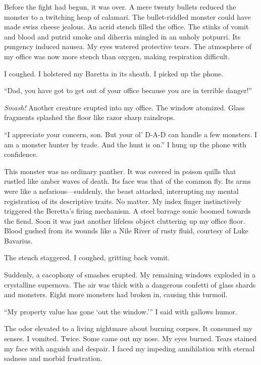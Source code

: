 Before the fight had begun, it was over. A mere twenty bullets
reduced the monster to a twitching heap of calamari. The
bullet-riddled monster could have made swiss cheese jealous. An
acrid stench filled the office. The stinks of vomit and blood and
putrid smoke and diherria mingled in an unholy potpurri. Its
pungency induced nausea. My eyes watered protective tears. The
atmosphere of my office was now more stench than oxygen, making
respiration difficult.



I coughed. I holstered my Baretta in its sheath. I picked up the
phone.

``Dad, you have got to get out of your office because you are
in terrible danger!''



{\em Smash!} Another creature erupted into my office. The window
atomized. Glass fragments splashed the floor like razor sharp
raindrops.



``I appreciate your concern, son. But your ol' D-A-D can
handle a few monsters. I am a monster hunter by trade. And the hunt
is on.'' I hung up the phone with confidence.



This monster was no ordinary panther. It was covered in poison
quills that rustled like amber waves of death. Its face was that of
the common fly. Its arms were like a nefarious---suddenly, the
beast attacked, interrupting my mental registration of its
descriptive traits. No matter. My index finger instinctively
triggered the Beretta's firing mechanism. A steel barrage
sonic boomed towards the fiend. Soon it was just another lifeless
object cluttering up my office floor. Blood gushed from its wounds
like a Nile River of rusty fluid, courtesy of Luke Bavarius.



The stench staggered. I coughed, gritting back vomit.



Suddenly, a cacophony of smashes erupted. My remaining windows
exploded in a crystalline supernova. The air was thick with a
dangerous confetti of glass shards and monsters. Eight more
monsters had broken in, causing this turmoil.



``My property value has gone `out the
window.''' I said with gallows humor.



The odor elevated to a living nightmare about burning corpses. It
consumed my senses. I vomited. Twice. Some came out my nose. My
eyes burned. Tears stained my face with anguish and despair. I
faced my impeding annihilation with eternal sadness and morbid
frustration.



